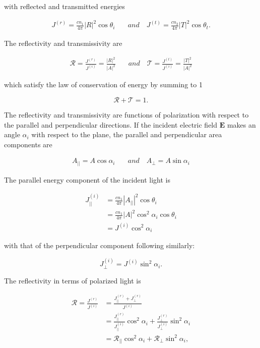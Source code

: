 with reflected and transmitted energies

\begin{align}
    J^{(r)} = \frac{cn_1}{4\pi} |R|^2 \cos{\theta_i} & \quad and \quad J^{(t)} = \frac{cn_2}{4\pi} |T|^2 \cos{\theta_t}.
\end{align}

The reflectivity and transmissivity are

\begin{align}
    \mathcal{R} = \frac{J^{(r)}}{J^{(i)}} = \frac{|R|^2}{|A|^2} & \quad and \quad \mathcal{T} = \frac{J^{(t)}}{J^{(i)}} = \frac{|T|^2}{|A|^2}
\end{align}

which satisfy the law of conservation of energy by summing to 1

\begin{equation}
    \mathcal{R} + \mathcal{T} = 1.
\end{equation}

The reflectivity and transmissivity are functions of polarization with respect to the parallel and perpendicular directions. If the incident electric field $\mathbf{E}$ makes an angle $\alpha_i$ with respect to the plane, the parallel and perpendicular area components are

\begin{align}
    A_{||} = A \cos{\alpha_i} & \quad and \quad A_{\perp} = A \sin{\alpha_i}
\end{align}

The parallel energy component of the incident light is

\begin{align}
    J_{||}^{(i)} &= \frac{cn_1}{4\pi} |A_{||}|^2 \cos{\theta_i} \nonumber \\
    &= \frac{cn_1}{4\pi} |A |^2 \cos^2{\alpha_i} \cos{\theta_i} \nonumber \\
    &= J^{(i)} \cos^2{\alpha_i}
\end{align}

with that of the perpendicular component following similarly:

\begin{equation}
    J_{\perp}^{(i)} = J^{(i)} \sin^2{\alpha_i}.
\end{equation}

The reflectivity in terms of polarized light is

\begin{align}
    \mathcal{R} = \frac{J^{(r)}}{J^{(i)}} &= \frac{J_{||}^{(r)} + J_{\perp}^{(r)}}{J^{(i)}} \nonumber \\
    &= \frac{J_{||}^{(r)}}{J_{||}^{(i)}} \cos^2{\alpha_i} + \frac{J_{\perp}^{(r)}}{J_{\perp}^{(i)}} \sin^2{\alpha_i} \nonumber \\
    &= \mathcal{R}_{||} \cos^2{\alpha_i} + \mathcal{R}_{\perp} \sin^2{\alpha_i},
\end{align}

